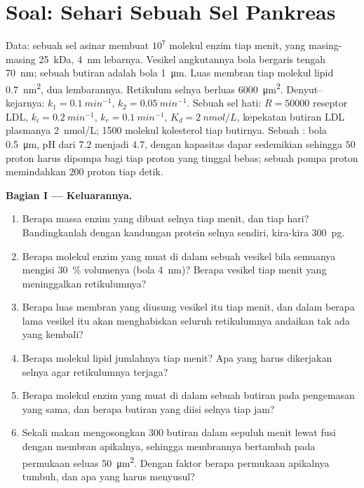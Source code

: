 \section{Soal: Sehari Sebuah Sel Pankreas}

\begin{problem}
\label{pb:b3:membrane-traffic:1}
Data: sebuah sel asinar membuat $10^{7}$ molekul enzim tiap menit, yang
masing-masing \qty{25}{kDa}, \qty{4}{nm} lebarnya. Vesikel angkutannya bola
bergaris tengah \qty{70}{nm}; sebuah butiran adalah bola \qty{1}{\micro m}.
Luas membran tiap molekul lipid \qty{0.7}{nm^2}, dua lembarannya. Retikulum
selnya berluas \qty{6000}{\micro m^2}. Denyut--kejarnya:
$k_{1} = \qty{0.1}{min^{-1}}$, $k_{2} = \qty{0.05}{min^{-1}}$. Sebuah sel
hati: $R = \num{50000}$ reseptor LDL, $k_{i} = \qty{0.2}{min^{-1}}$,
$k_{r} = \qty{0.1}{min^{-1}}$, $K_{d} = \qty{2}{nmol/L}$, kepekatan butiran
LDL plasmanya \qty{2}{nmol/L}; \num{1500} molekul kolesterol
tiap butirnya.
Sebuah : bola \qty{0.5}{\micro m}, pH dari $7.2$ menjadi $4.7$,
dengan kapasitas dapar sedemikian sehingga $50$ proton harus dipompa bagi tiap
proton yang tinggal bebas; sebuah pompa proton memindahkan $200$ proton tiap detik.

\medskip
\noindent\textbf{Bagian I --- Keluarannya.}
\begin{enumerate}
  \item Berapa massa enzim yang dibuat selnya tiap menit, dan tiap hari?
        Bandingkanlah dengan kandungan protein selnya sendiri, kira-kira
        \qty{300}{pg}.
  \item Berapa molekul enzim yang muat di dalam sebuah vesikel bila
        semuanya mengisi \qty{30}{\%} volumenya (bola \qty{4}{nm})? Berapa
        vesikel tiap menit yang meninggalkan retikulumnya?
  \item Berapa luas membran yang diusung vesikel itu tiap menit, dan
        dalam berapa lama vesikel itu akan menghabiskan seluruh retikulumnya
        andaikan tak ada yang kembali?
  \item Berapa molekul lipid jumlahnya tiap menit? Apa yang harus dikerjakan
        selnya agar retikulumnya terjaga?
  \item Berapa molekul enzim yang muat di dalam sebuah butiran pada
        pengemasan yang sama, dan berapa butiran yang diisi selnya tiap jam?
  \item Sekali makan mengosongkan $300$ butiran dalam sepuluh menit lewat
        fusi dengan membran apikalnya, sehingga membrannya bertambah pada
        permukaan seluas \qty{50}{\micro m^2}. Dengan faktor berapa permukaan
        apikalnya tumbuh, dan apa yang harus menyusul?
\end{enumerate}


\end{problem}
